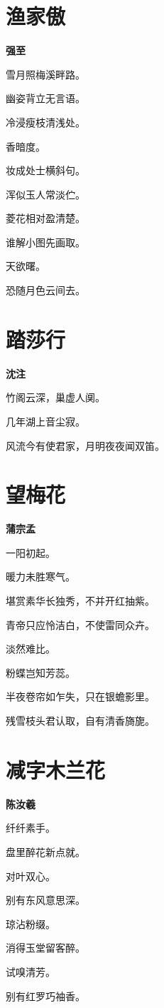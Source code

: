 \documentclass[12pt,a4paper]{ctexbook}
\begin{document}
\section{渔家傲}
\textbf{强至}\par\vspace{0.5em}
雪月照梅溪畔路。\par
幽姿背立无言语。\par
冷浸瘦枝清浅处。\par
香暗度。\par
妆成处士横斜句。\par
浑似玉人常淡伫。\par
菱花相对盈清楚。\par
谁解小图先画取。\par
天欲曙。\par
恐随月色云间去。\par

\section{踏莎行}
\textbf{沈注}\par\vspace{0.5em}
竹阁云深，巢虚人阒。\par
几年湖上音尘寂。\par
风流今有使君家，月明夜夜闻双笛。\par

\section{望梅花}
\textbf{蒲宗孟}\par\vspace{0.5em}
一阳初起。\par
暖力未胜寒气。\par
堪赏素华长独秀，不并开红抽紫。\par
青帝只应怜洁白，不使雷同众卉。\par
淡然难比。\par
粉蝶岂知芳蕊。\par
半夜卷帘如乍失，只在银蟾影里。\par
残雪枝头君认取，自有清香旖旎。\par

\section{减字木兰花}
\textbf{陈汝羲}\par\vspace{0.5em}
纤纤素手。\par
盘里醉花新点就。\par
对叶双心。\par
别有东风意思深。\par
琼沾粉缀。\par
消得玉堂留客醉。\par
试嗅清芳。\par
别有红罗巧袖香。\par
\end{document}
